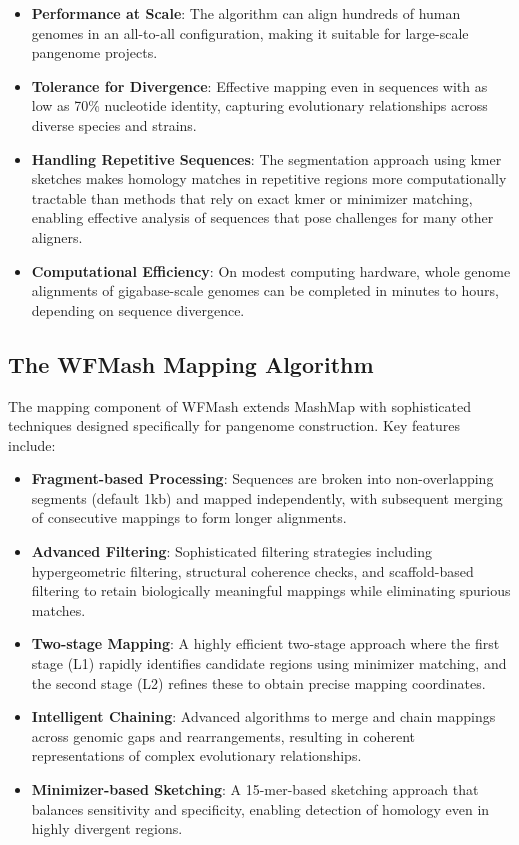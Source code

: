 \documentclass{article}
\begin{document}
\begin{itemize}
    \item \textbf{Performance at Scale}: The algorithm can align hundreds of human genomes in an all-to-all configuration, making it suitable for large-scale pangenome projects.
    
    \item \textbf{Tolerance for Divergence}: Effective mapping even in sequences with as low as 70\% nucleotide identity, capturing evolutionary relationships across diverse species and strains.
    
    \item \textbf{Handling Repetitive Sequences}: The segmentation approach using kmer sketches makes homology matches in repetitive regions more computationally tractable than methods that rely on exact kmer or minimizer matching, enabling effective analysis of sequences that pose challenges for many other aligners.
    
    \item \textbf{Computational Efficiency}: On modest computing hardware, whole genome alignments of gigabase-scale genomes can be completed in minutes to hours, depending on sequence divergence.
\end{itemize}

\subsection{The WFMash Mapping Algorithm}

The mapping component of WFMash extends MashMap with sophisticated techniques designed specifically for pangenome construction. Key features include:

\begin{itemize}
    \item \textbf{Fragment-based Processing}: Sequences are broken into non-overlapping segments (default 1kb) and mapped independently, with subsequent merging of consecutive mappings to form longer alignments.
    
    \item \textbf{Advanced Filtering}: Sophisticated filtering strategies including hypergeometric filtering, structural coherence checks, and scaffold-based filtering to retain biologically meaningful mappings while eliminating spurious matches.
    
    \item \textbf{Two-stage Mapping}: A highly efficient two-stage approach where the first stage (L1) rapidly identifies candidate regions using minimizer matching, and the second stage (L2) refines these to obtain precise mapping coordinates.
    
    \item \textbf{Intelligent Chaining}: Advanced algorithms to merge and chain mappings across genomic gaps and rearrangements, resulting in coherent representations of complex evolutionary relationships.
    
    \item \textbf{Minimizer-based Sketching}: A 15-mer-based sketching approach that balances sensitivity and specificity, enabling detection of homology even in highly divergent regions.
\end{itemize}
\end{document}
